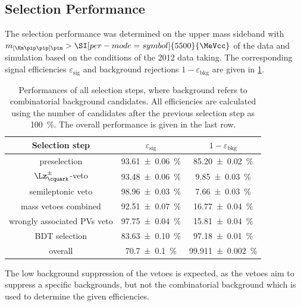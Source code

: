 \subsection{Selection Performance}
\label{sec:selectionPerformance}

The selection performance was determined on the upper mass sideband with $m_{\left[\Km\pip\pip\right]\pim}>\SI[per-mode=symbol]{5500}{\MeVcc}$ of the data and simulation based on the conditions of the \num{2012} data taking.
The corresponding signal efficiencies $\varepsilon_{\text{sig}}$ and background rejections $1-\varepsilon_{\text{bkg}}$ are given in \cref{tab:selPerform}.
\begin{table}[tbp]
	\centering
	\caption{Performances of all selection steps, where background refers to combinatorial background candidates.
	All efficiencies are calculated using the number of candidates after the previous selection step as \SI{100}{\percent}.
	The overall performance is given in the last row.}
	\begin{tabular}{ccc}
		\toprule
		Selection step						& $\varepsilon_{\text{sig}}$  & $1-\varepsilon_{\text{bkg}}$ \\
		\midrule
		preselection						& \SI{93.61\pm0.06}{\percent} & \SI{85.20\pm0.02}{\percent} \\
		\midrule
		$\Lz^\pm_\cquark$-veto				& \SI{93.48\pm0.06}{\percent} & \SI{9.85\pm0.03}{\percent} \\
		semileptonic veto					& \SI{98.96\pm0.03}{\percent} & \SI{7.66\pm0.03}{\percent} \\
		mass vetoes combined				& \SI{92.51\pm0.07}{\percent} & \SI{16.77\pm0.04}{\percent} \\
		\midrule
		wrongly associated \ac{PV}s veto	& \SI{97.75\pm0.04}{\percent} & \SI{15.81\pm0.04}{\percent} \\
		BDT selection						& \SI{83.63\pm0.10}{\percent} & \SI{97.18\pm0.01}{\percent} \\
		\midrule
		overall								& \SI{70.7\pm0.1}{\percent}   & \SI{99.911\pm0.002}{\percent} \\
		\bottomrule
	\end{tabular}
	\label{tab:selPerform}
\end{table}
The low background suppression of the vetoes is expected, as the vetoes aim to suppress a specific backgrounds, but not the combinatorial background which is used to determine the given efficiencies.

